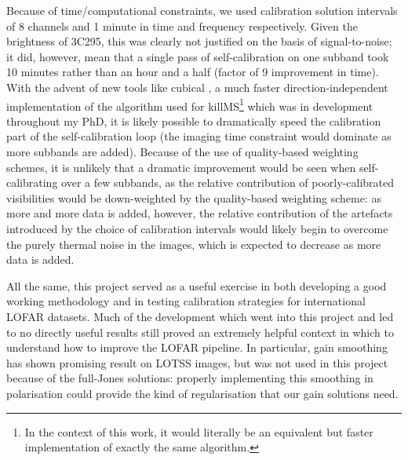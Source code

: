 \pg
Because of time/computational constraints, we used calibration solution intervals of 8 channels and 1 minute in time and frequency respectively. Given the brightness of 3C295, this was clearly not justified on the basis of signal-to-noise; it did, however, mean that a single pass of self-calibration on one subband took 10 minutes rather than an hour and a half (factor of 9 improvement in time). With the advent of new tools like cubical , a much faster direction-independent implementation of the algorithm used for killMS\footnote{In the context of this work, it would literally be an equivalent but faster implementation of exactly the same algorithm.} which was in development throughout my PhD, it is likely possible to dramatically speed the calibration part of the self-calibration loop (the imaging time constraint would dominate as more subbands are added). Because of the use of quality-based weighting schemes, it is unlikely that a dramatic improvement would be seen when self-calibrating over a few subbands, as the relative contribution of poorly-calibrated visibilities would be down-weighted by the quality-based weighting scheme: as more and more data is added, however, the relative contribution of the artefacts introduced by the choice of calibration intervals would likely begin to overcome the purely thermal noise in the images, which is expected to decrease as more data is added.%

\pg
All the same, this project served as a useful exercise in both developing a good working methodology and in testing calibration strategies for international LOFAR datasets. Much of the development which went into this project and led to no directly useful results still proved an extremely helpful context in which to understand how to improve the LOFAR pipeline. In particular, gain smoothing has shown promising result on LOTSS images, but was not used in this project because of the full-Jones solutions: properly implementing this smoothing in polarisation could provide the kind of regularisation that our gain solutions need.

